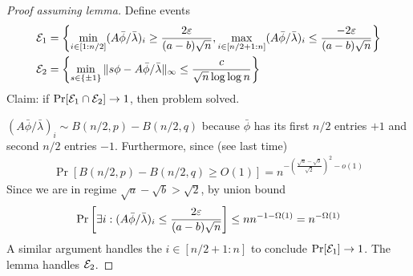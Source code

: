 \begin{proof}[Proof assuming lemma]
  Define events
  \begin{align}
    \mathcal{E}_1 &= \left\{ \min_{i \in [1:n/2]} (A \bar\phi / \bar\lambda)_i \geq \frac{2 \varepsilon}{(a - b)\sqrt{n}},
    \max_{i \in [n/2+1:n]} (A \bar\phi / \bar\lambda)_i \leq \frac{-2 \varepsilon}{(a-b)\sqrt{n}} \right\} \\
    \mathcal{E}_2 &= \left\{ \min_{s \in \{\pm1\}} \|s \phi - A \bar\phi / \bar\lambda \|_\infty
    \leq \frac{c}{\sqrt{n} \log\log n} \right\}
  \end{align}
  Claim: if $\Pr[\mathcal{E}_1 \cap \mathcal{E}_2] \to 1$, then problem solved.

  $(A \bar\phi / \bar\lambda)_i \sim B(n/2, p) - B(n/2, q)$ because
  $\bar\phi$ has its first $n/2$ entries $+1$ and second $n/2$ entries
  $-1$. Furthermore, since (see last time)
  \begin{align}
    \Pr[B(n/2, p) - B(n/2,q) \geq O(1)] = n^{-\left(\frac{\sqrt{a} - \sqrt{b}}{\sqrt{2}}\right)^2 - o(1)}
  \end{align}
  Since we are in regime $\sqrt{a} - \sqrt{b} > \sqrt{2}$, by union bound
  \begin{align}
    \Pr\left[\exists i : (A \bar\phi / \bar\lambda)_i \leq \frac{2 \varepsilon}{(a-b)\sqrt{n}}
    \right] \leq n n^{-1 - \Omega(1)} = n^{-\Omega(1)}
  \end{align}
  A similar argument handles the $i \in [n/2+1:n]$ to
  conclude $\Pr[\mathcal{E}_1] \to 1$. The lemma handles $\mathcal{E}_2$.
\end{proof}

